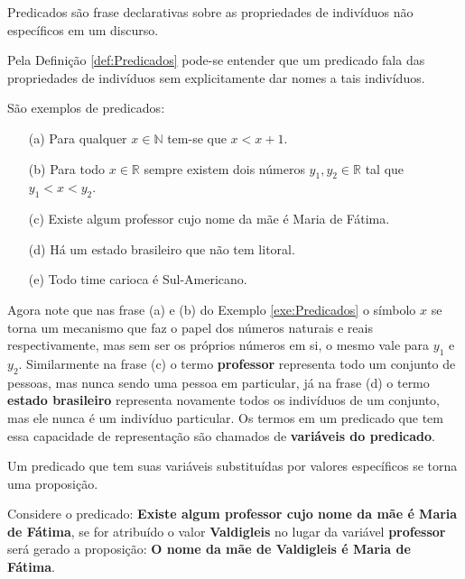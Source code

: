 \begin{definition}[Predicados]\label{def:Predicados}
	Predicados são frase declarativas sobre as propriedades de indivíduos não específicos em um discurso.
\end{definition}

Pela Definição \ref{def:Predicados} pode-se entender que um predicado fala das propriedades de indivíduos sem explicitamente dar nomes a tais indivíduos.

\begin{example}\label{exe:Predicados}
	São exemplos de predicados:
	\begin{itemize}
		\item[(a)] Para qualquer $x \in \mathbb{N}$ tem-se que $x < x + 1$.
		\item[(b)] Para todo $x \in \mathbb{R}$ sempre existem dois números $y_1, y_2 \in \mathbb{R}$ tal que $y_1 < x < y_2$.
		\item[(c)] Existe algum professor cujo nome da mãe é Maria de Fátima.
		\item[(d)] Há um estado brasileiro que não tem litoral.
		\item[(e)] Todo time carioca é Sul-Americano.
	\end{itemize}
\end{example}

Agora note que nas frase (a) e (b) do Exemplo \ref{exe:Predicados} o símbolo $x$ se torna um mecanismo que faz o papel dos números naturais e reais respectivamente, mas sem ser os próprios números em si, o mesmo vale para $y_1$ e $y_2$. Similarmente na frase (c) o termo \textbf{professor} representa todo um conjunto de pessoas, mas nunca sendo uma pessoa em particular, já na frase (d) o termo \textbf{estado brasileiro} representa novamente todos os indivíduos de um conjunto, mas ele nunca é um indivíduo particular. Os termos em um predicado que tem essa capacidade de representação são chamados de \textbf{variáveis do predicado}.

\begin{remark}
    Um predicado que tem suas variáveis substituídas por valores específicos se torna uma proposição. 
\end{remark}

\begin{example}\label{exe:AtribuirVariavelPredicado}
	Considere o predicado: \textbf{Existe algum professor cujo nome da mãe é Maria de Fátima}, se for atribuído o valor  \textbf{Valdigleis} no lugar da variável \textbf{professor} será gerado a proposição: \textbf{O nome da mãe de Valdigleis é Maria de Fátima}.
\end{example}

